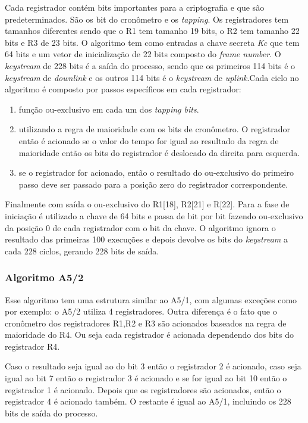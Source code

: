 Cada registrador contém bits importantes para a criptografia e que são predeterminados. São os bit do cronômetro e os \textit{tapping}. Os registradores tem tamanhos diferentes sendo que o R1 tem tamanho 19 bits, o R2 tem tamanho 22 bits e R3 de 23 bits. O algoritmo tem como entradas a chave secreta \textit{Kc} que tem 64 bits e um vetor de inicialização de 22 bits composto do \textit{frame number}. O \textit{keystream} de 228 bits é a saída do processo, sendo que os primeiros 114 bits é o \textit{keystream} de \textit{downlink} e os outros 114 bits é o \textit{keystream} de \textit{uplink}.Cada ciclo no algoritmo é composto por passos específicos em cada registrador:

\begin{enumerate}
\item função ou-exclusivo em cada um dos \textit{tapping bits}.
\item utilizando a regra de maioridade com os bits de cronômetro. O registrador então é acionado se o valor do tempo for igual ao resultado da regra de maioridade então os bits do registrador é deslocado da direita para esquerda.
\item se o registrador for acionado, então o resultado do ou-exclusivo do primeiro passo deve ser passado para a posição zero do registrador correspondente.
\end{enumerate}

Finalmente com saída o ou-exclusivo do R1[18], R2[21] e R[22]. Para a fase de iniciação é utilizado a chave de 64 bits e passa de bit por bit fazendo ou-exclusivo da posição 0 de cada registrador com o bit da chave. O algoritmo ignora o resultado das primeiras 100 execuções e depois devolve os bits do \textit{keystream} a cada 228 ciclos, gerando 228 bits de saída.
\subsubsection{Algoritmo A5/2}
\label{algorithm-a52}

Esse algoritmo tem uma estrutura similar ao A5/1, com algumas exceções como por exemplo: o A5/2 utiliza 4 registradores. Outra diferença é o fato que o cronômetro dos registradores R1,R2 e R3 são acionados baseados na regra de maioridade do R4. Ou seja cada registrador é acionada dependendo dos bits do registrador R4. 

Caso o resultado seja igual ao do bit 3 então o registrador 2 é acionado, caso seja igual ao bit 7 então o registrador 3 é acionado e se for igual ao bit 10 então o registrador 1 é acionado. Depois que os registradores são acionados, então o registrador 4 é acionado também. O restante é igual ao A5/1, incluindo os 228 bits de saída do processo.
